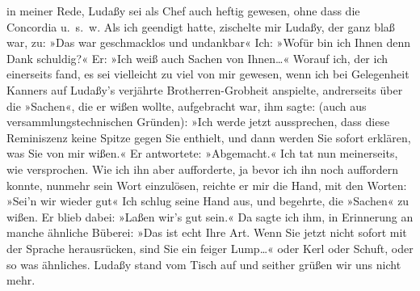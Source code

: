                in meiner Rede, Ludaßy sei als Chef auch
               heftig gewesen, ohne dass die Concordia u. s. w.
               Als ich geendigt hatte, zischelte mir Ludaßy,
               der ganz blaß war, zu: »Das war geschmacklos und undankbar{\dotstwo}« Ich: »Wofür bin ich Ihnen denn Dank schuldig?« Er: »Ich weiß auch Sachen von
                  Ihnen{\dots}« Worauf ich, der ich einerseits fand, es sei
               vielleicht zu viel von mir gewesen, wenn ich bei Gelegenheit Kanners auf Ludaßy’s
               verjährte Brotherren-Grobheit anspielte, andrerseits über die »Sachen«, die er wißen
               wollte, aufgebracht war, ihm sagte: (auch aus versammlungstechnischen Gründen): »Ich
               werde jetzt aussprechen, dass diese Reminiszenz keine Spitze gegen Sie enthielt, und
               dann werden Sie sofort erklären, was Sie von mir wißen.« Er antwortete: »Abgemacht.«
               Ich tat nun meinerseits, wie versprochen. Wie ich ihn aber aufforderte, ja bevor ich
               ihn noch auffordern konnte, nunmehr sein Wort einzulösen, reichte er mir die Hand,
               mit den Worten: »Sei’n wir wieder gut{\dotstwo}« Ich schlug seine
               Hand aus, und begehrte, die »Sachen« zu wißen. Er blieb dabei: »Laßen wir’s gut
               sein.« Da sagte ich ihm, in Erinnerung an manche ähnliche Büberei: »Das ist echt Ihre
               Art. Wenn Sie jetzt nicht sofort mit {\pb}der Sprache herausrücken, sind
               Sie ein feiger Lump{\dots}« oder Kerl {\dotstwo} oder Schuft, oder so was ähnliches. Ludaßy
               stand vom Tisch auf und seither grüßen wir uns nicht mehr.\pend
           
